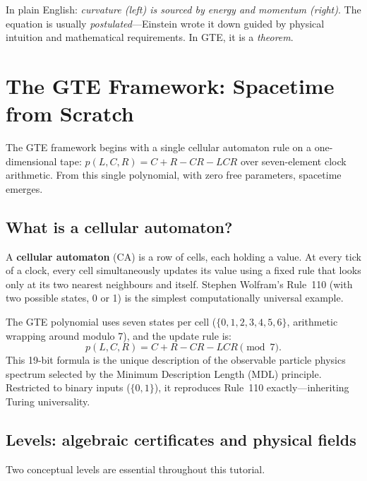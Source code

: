 \documentclass[11pt,a4paper]{article}
\newcommand{\term}[1]{\textbf{#1}}
\begin{document}
In plain English: \emph{curvature (left) is sourced by energy and momentum (right)}.
The equation is usually \emph{postulated}---Einstein wrote it down guided by physical
intuition and mathematical requirements.  In GTE, it is a \emph{theorem}.

\section{The GTE Framework: Spacetime from Scratch}

\begin{tcolorbox}[colback=boxblue,colframe=blue!40!black,title=Starting point]
The GTE framework begins with a single cellular automaton rule on a one-dimensional
tape: $p(L,C,R) = C + R - CR - LCR$ over seven-element clock arithmetic.
From this single polynomial, with zero free parameters, spacetime emerges.
\end{tcolorbox}

\subsection{What is a cellular automaton?}

A \term{cellular automaton} (CA) is a row of cells, each holding a value.
At every tick of a clock, every cell simultaneously updates its value using a fixed
rule that looks only at its two nearest neighbours and itself.
Stephen Wolfram's Rule~110 (with two possible states, 0 or 1) is the simplest
computationally universal example.

The GTE polynomial uses seven states per cell ($\{0,1,2,3,4,5,6\}$, arithmetic
wrapping around modulo 7), and the update rule is:
\[
  p(L,C,R) = C + R - CR - LCR \pmod{7}.
\]
This 19-bit formula is the unique description of the observable particle physics
spectrum selected by the Minimum Description Length (MDL) principle.
Restricted to binary inputs ($\{0,1\}$), it reproduces Rule~110 exactly---inheriting
Turing universality.

\subsection{Levels: algebraic certificates and physical fields}

Two conceptual levels are essential throughout this tutorial.
\end{document}
